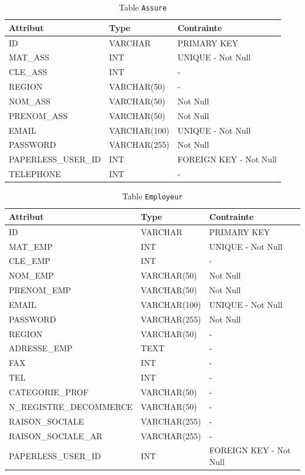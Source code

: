 \begin{table}[h!]
\centering
\begin{tabular}{|l|l|l|}
\hline
\textbf{Attribut} & \textbf{Type} & \textbf{Contrainte} \\
\hline
ID & VARCHAR & PRIMARY KEY \\
MAT\_ASS & INT & UNIQUE - Not Null \\
CLE\_ASS & INT & - \\
REGION & VARCHAR(50) & - \\
NOM\_ASS & VARCHAR(50) & Not Null \\
PRENOM\_ASS & VARCHAR(50) & Not Null \\
EMAIL & VARCHAR(100) & UNIQUE - Not Null \\
PASSWORD & VARCHAR(255) & Not Null \\
PAPERLESS\_USER\_ID & INT & FOREIGN KEY - Not Null \\
TELEPHONE & INT & - \\
\hline
\end{tabular}
\caption{Table \texttt{Assure}}
\end{table}
\clearpage
\begin{table}[h!]
\centering
\begin{tabular}{|l|l|l|}
\hline
\textbf{Attribut} & \textbf{Type} & \textbf{Contrainte} \\
\hline
ID & VARCHAR & PRIMARY KEY \\
MAT\_EMP & INT & UNIQUE - Not Null \\
CLE\_EMP & INT & - \\
NOM\_EMP & VARCHAR(50) & Not Null \\
PRENOM\_EMP & VARCHAR(50) & Not Null \\
EMAIL & VARCHAR(100) & UNIQUE - Not Null \\
PASSWORD & VARCHAR(255) & Not Null \\
REGION & VARCHAR(50) & - \\
ADRESSE\_EMP & TEXT & - \\
FAX & INT & - \\
TEL & INT & - \\
CATEGORIE\_PROF & VARCHAR(50) & - \\
N\_REGISTRE\_DECOMMERCE & VARCHAR(50) & - \\
RAISON\_SOCIALE & VARCHAR(255) & - \\
RAISON\_SOCIALE\_AR & VARCHAR(255) & - \\
PAPERLESS\_USER\_ID & INT & FOREIGN KEY - Not Null \\
\hline
\end{tabular}
\caption{Table \texttt{Employeur}}
\end{table}
